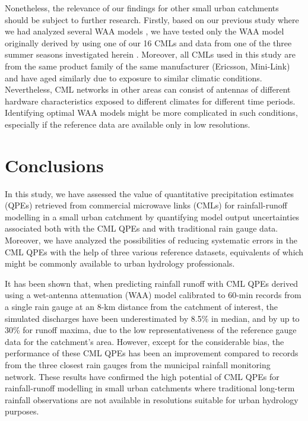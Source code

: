 \documentclass{ctuthesis}\usepackage[]{graphicx}\usepackage[]{color}
\begin{document}
Nonetheless, the relevance of our findings for other small urban catchments should be subject to further research. Firstly, based on our previous study where we had analyzed several WAA models \cite[][chapter~\ref{chap6}]{pastorekPrecipitationEstimatesCommercial2022}, we have tested only the WAA model originally derived by using one of our 16 CMLs and data from one of the three summer seasons investigated herein \citep{valtrExcessAttenuationCaused2019}. Moreover, all CMLs used in this study are from the same product family of the same manufacturer (Ericsson, Mini-Link) and have aged similarly due to exposure to similar climatic conditions. Nevertheless, CML networks in other areas can consist of antennas of different hardware characteristics exposed to different climates for different time periods. Identifying optimal WAA models might be more complicated in such conditions, especially if the reference data are available only in low resolutions. 





\section{Conclusions}

In this study, we have assessed the value of quantitative precipitation estimates (QPEs) retrieved from commercial microwave links (CMLs) for rainfall-runoff modelling in a small urban catchment by quantifying model output uncertainties associated both with the CML QPEs and with traditional rain gauge data. Moreover, we have analyzed the possibilities of reducing systematic errors in the CML QPEs with the help of three various reference datasets, equivalents of which might be commonly available to urban hydrology professionals.

It has been shown that, when predicting rainfall runoff with CML QPEs derived using a wet-antenna attenuation (WAA) model calibrated to 60-min records from a single rain gauge at an 8-km distance from the catchment of interest, the simulated discharges have been underestimated by 8.5\% in median, and by up to 30\% for runoff maxima, due to the low representativeness of the reference gauge data for the catchment's area. However, except for the considerable bias, the performance of these CML QPEs has been an improvement compared to records from the three closest rain gauges from the municipal rainfall monitoring network. These results have confirmed the high potential of CML QPEs for rainfall-runoff modelling in small urban catchments where traditional long-term rainfall observations are not available in resolutions suitable for urban hydrology purposes.
\end{document}
